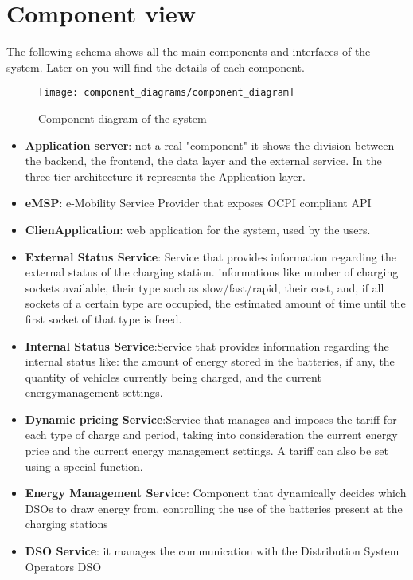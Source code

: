 \clearpage

\section{Component view}
The following schema shows all the main components and interfaces of the system. Later on you will find the details of each component.


\begin{figure}[h]
\centering
\texttt{[image: component\_diagrams/component\_diagram]}
\caption{Component diagram of the system}
\end{figure}

\clearpage
\newpage

\begin{itemize}
	\item \textbf{Application server}: not a real "component" it shows the division between the backend, the frontend, the data layer and the external service. In the three-tier architecture it represents the Application layer.
	\item \textbf{eMSP}: e-Mobility Service Provider that exposes OCPI compliant API
	\item \textbf{ClienApplication}: web application for the system, used by the users.
	\item \textbf{External Status Service}: Service that provides information regarding the external status of the charging station. informations like number of charging sockets available, their type such as slow/fast/rapid, their cost, and, if all sockets of a certain type are occupied, the estimated amount of time until the first socket of that type is freed.
	\item \textbf{Internal Status Service}:Service that provides information regarding the internal status like: the amount of energy stored in the batteries, if any, the quantity of vehicles currently being charged, and the current energymanagement settings.
	\item \textbf{Dynamic pricing Service}:Service that manages and imposes the tariff for each type of charge and period, taking into consideration the current energy price and the current energy management settings. A tariff can also be set using a special function.
	\item \textbf{Energy Management Service}: Component that dynamically decides which DSOs to draw energy from, controlling the use of the batteries present at the charging stations
	\item \textbf{DSO Service}: it manages the communication with the Distribution System Operators DSO

\end{itemize}
